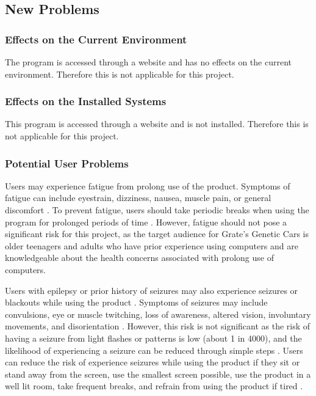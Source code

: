 \documentclass[12pt, titlepage]{article}
\begin{document}
\subsection{New Problems}

\subsubsection{Effects on the Current Environment}
The program is accessed through a website and has no effects on the current environment. Therefore this is not applicable for this project.

\subsubsection{Effects on the Installed Systems}
This program is accessed through a website and is not installed. Therefore this is not applicable for this project.

\subsubsection{Potential User Problems}
Users may experience fatigue from prolong use of the product. Symptoms of 
fatigue can include eyestrain, dizziness, nausea, muscle pain, or general 
discomfort \citep{nintendo}. To prevent fatigue, users should take periodic 
breaks when using the 
program for prolonged periods of time \citep{nintendo}. However, fatigue should 
not pose a 
significant risk for this project, as the target audience for Grate's Genetic 
Cars is older teenagers and adults who have prior experience using computers and 
are  knowledgeable about the health concerns associated with prolong use of 
computers.

Users with epilepsy or prior history of seizures may also experience seizures or 
blackouts while using the product \citep{nintendo}. Symptoms of seizures may 
include convulsions, 
eye or muscle twitching, loss of awareness, altered vision, involuntary 
movements, and disorientation \citep{nintendo}. However, this risk is not 
significant as the risk 
of having a seizure from light flashes or patterns is low (about 1 in 4000), and 
the likelihood of experiencing a seizure can be reduced through simple steps 
\citep{nintendo}. 
Users can reduce the risk of experience seizures while using the product if they 
sit or stand away from the screen, use the smallest screen possible, use the 
product in a well lit room, take frequent breaks, and refrain from using the 
product if tired \citep{nintendo}.
\end{document}
